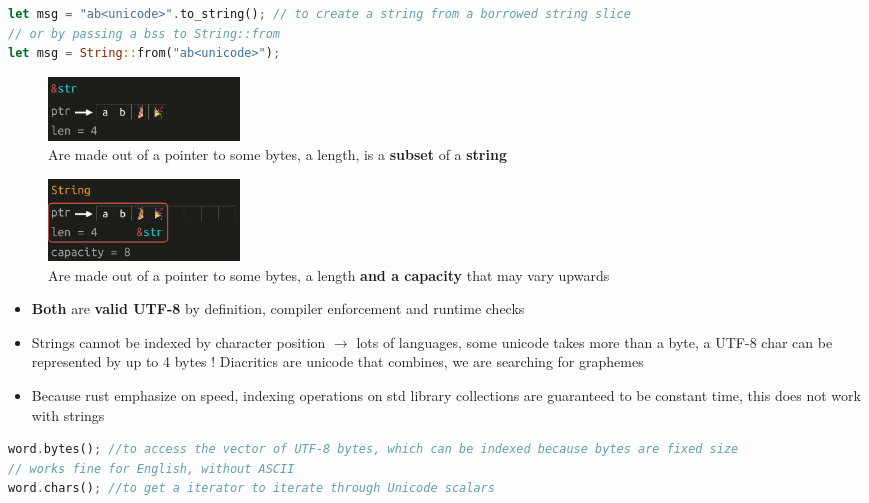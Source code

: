 \documentclass{report}
\begin{document}
\begin{multicols*}{2}
\begin{tcolorbox}[title=Creating String,colback=backcolour,size=small,left=4mm]
\begin{lstlisting}[language=rust]
let msg = "ab<unicode>".to_string(); // to create a string from a borrowed string slice
// or by passing a bss to String::from
let msg = String::from("ab<unicode>");
\end{lstlisting}
\end{tcolorbox}
\begin{figure}[H] 
	 \centering 
	 \includegraphics[width=2in]{screenshots/2022-07-15T23-25-31Z.png} 
   \caption{Are made out of a pointer to some bytes, a length, is a \textbf{subset} of a \textbf{string} }
 \end{figure}

 \begin{figure}[H] 
	 \centering 
	 \includegraphics[width=2in]{screenshots/2022-07-15T23-28-08Z.png} 
	 \caption{Are made out of a pointer to some bytes, a length \textbf{and a capacity} that may vary upwards} 
 \end{figure}

\begin{itemize}
  \item \textbf{Both} are \textbf{valid UTF-8} by definition, compiler enforcement and runtime checks 
  \item Strings cannot be indexed by character position $\rightarrow$ lots of languages, some unicode
    takes more than a byte, a UTF-8 char can be represented by up to 4 bytes ! Diacritics are unicode that combines,
    we are searching for graphemes 
  \item Because rust emphasize on speed, indexing operations on std library collections are guaranteed to be constant time,
    this does not work with strings
\end{itemize}

\begin{tcolorbox}[title=When presented with a string,colback=backcolour,size=small,left=4mm]
\begin{lstlisting}[language=rust]
word.bytes(); //to access the vector of UTF-8 bytes, which can be indexed because bytes are fixed size
// works fine for English, without ASCII
word.chars(); //to get a iterator to iterate through Unicode scalars


\end{lstlisting}
\end{tcolorbox}
\end{multicols*}
\end{document}

